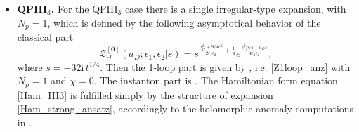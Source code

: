 \documentclass[12pt,a4paper]{article}
\numberwithin{equation}{section}
\newcommand{\ri}{\mathrm{i}}
\newcommand{\D}{\scriptscriptstyle{D}}
\begin{document}
\begin{itemize}
    \begin{equation}
\mathcal{Z}_{cl}^{[\mathbf{1}]}(a_{\D},\tilde{m}_1;\epsilon_1,\epsilon_2|\tilde{s})=\tilde{s}^{\frac{a_{\D}^2+23\epsilon^2/12-2\tilde{m}_1^2}{2\epsilon_1\epsilon_2}+\frac1{12}}e^{\frac{\tilde{s}^2/8+\tilde{m}_1 \tilde{s}-\sqrt3 a_{\D} \tilde{s}}{\epsilon_1\epsilon_2}},    
\end{equation}
where $\tilde{s}=\big(\frac{m_1}{\tilde{m}_1}\big)^{1/3}s=\big(54\frac{m_1}{\tilde{m}_1}t\big)^{1/3}$. It already depends on the integration constant $\tilde{m}_1$. Then the mass-independent 1-loop part is given by \cite[(4.61)]{BST25}, i.e. \eqref{Z1loop_anz} with $N_p=1$ and $\chi=-\ln (-12\sqrt{3})$.
The instanton part \cite[(4.55)]{BST25} depends on the integration constant $\tilde{m}_1$ right away from order $\tilde{s}^{-1}$.
To fix $\tilde{m}_1$ from the Hamiltonian form equation \eqref{Ham_III2} it is enough to use only the leading term $2\beta s=-\frac14\big(\frac{m_1}{\tilde{m}_1}\big)^{1/3}\tilde{s}$ of the expansion \eqref{Ham_strong_ansatz}. It gives $\tilde{m}_1^2=m_1^2$, accordingly to the holomorphic anomaly computations in \cite[Sec. 5.3]{BST25}.
    \item {\bf QPIII$_3$.}
    For the QPIII$_3$ case there is a single irregular-type expansion, with $N_p=1$, which is defined by the following asymptotical behavior of the classical part \cite[(4.67)]{BST25}
    \begin{equation}
    \label{Zcl_0} \mathcal{Z}_{cl}^{[\mathbf{0}]}(a_{\D};\epsilon_1,\epsilon_2|s)=s^{\frac{a_{\D}^2+9/4\epsilon^2}{2\epsilon_1\epsilon_2}+\frac14}e^{\frac{s^2/64+a_{\D} s}{4\epsilon_1\epsilon_2}},   
    \end{equation}
    where $s=-32\ri\, t^{1/4}$. Then the 1-loop part is given by \cite[(4.70)]{BST25}, i.e. \eqref{Z1loop_anz} with $N_p=1$ and $\chi=0$.
The instanton part is \cite[(4.69)]{BST25}. The Hamiltonian form equation \eqref{Ham_III3} is fulfilled simply by the structure of expansion \eqref{Ham_strong_ansatz}, accordingly to the holomorphic anomaly computations in \cite[Sec. 5.4]{BST25}.
   

\end{itemize}
\end{document}
